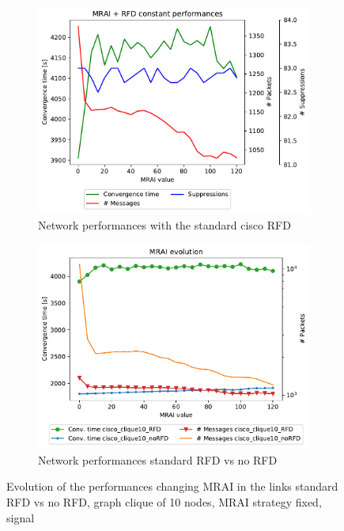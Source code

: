 \begin{figure}[h]
     \centering
     \begin{subfigure}[b]{0.45\textwidth}
         \centering
		 \includegraphics[width=\textwidth]{images/RFD/clique/cisco_clique10_RFD-constant_mrai_rfd_evolution.pdf}
		 \caption{Network performances with the standard cisco \ac{RFD}}
		 \label{fig:clique_evolution_rfd}
     \end{subfigure}
     \hfill
     \begin{subfigure}[b]{0.45\textwidth}
         \centering
         \includegraphics[width=\textwidth]{images/RFD/clique/cisco_clique10_comparison_constant_all.pdf}
		 \caption{Network performances standard \ac{RFD} vs no \ac{RFD}}
         \label{fig:clique_evolution_rfd_vs_noRFd_comparison}
     \end{subfigure}
		\caption{Evolution of the performances changing \ac{MRAI} in the links
			standard \ac{RFD} vs no \ac{RFD},
			graph clique of \num{10} nodes, \ac{MRAI} strategy fixed, signal }
        \label{fig:clique_evolution_rfd_vs_noRFD}
\end{figure}

